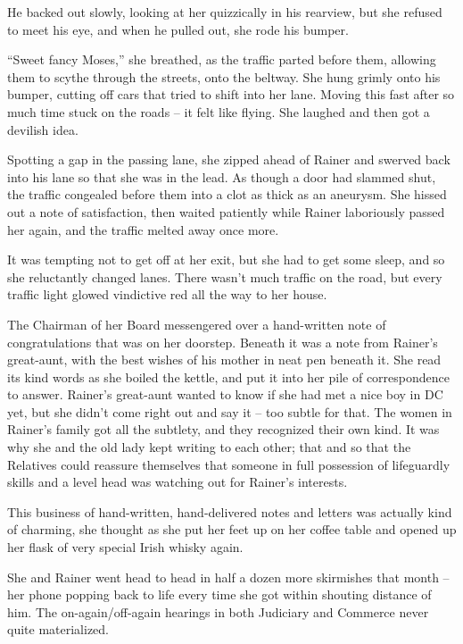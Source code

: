 He backed out slowly, looking at her quizzically in his rearview, but 
she refused to meet his eye, and when he pulled out, she rode his 
bumper.

“Sweet fancy Moses,” she breathed, as the traffic parted before 
them, allowing them to scythe through the streets, onto the beltway. 
She hung grimly onto his bumper, cutting off cars that tried to shift 
into her lane. Moving this fast after so much time stuck on the roads 
-- it felt like flying. She laughed and then got a devilish idea.

Spotting a gap in the passing lane, she zipped ahead of Rainer and 
swerved back into his lane so that she was in the lead. As though a 
door had slammed shut, the traffic congealed before them into a clot as 
thick as an aneurysm. She hissed out a note of satisfaction, then 
waited patiently while Rainer laboriously passed her again, and the 
traffic melted away once more.

It was tempting not to get off at her exit, but she had to get some 
sleep, and so she reluctantly changed lanes. There wasn't much traffic 
on the road, but every traffic light glowed vindictive red all the way 
to her house.

The Chairman of her Board messengered over a hand-written note of 
congratulations that was on her doorstep. Beneath it was a note from 
Rainer's great-aunt, with the best wishes of his mother in neat pen 
beneath it. She read its kind words as she boiled the kettle, and put 
it into her pile of correspondence to answer. Rainer's great-aunt 
wanted to know if she had met a nice boy in DC yet, but she didn't come 
right out and say it -- too subtle for that. The women in Rainer's 
family got all the subtlety, and they recognized their own kind. It was 
why she and the old lady kept writing to each other; that and so that 
the Relatives could reassure themselves that someone in full possession 
of lifeguardly skills and a level head was watching out for Rainer's 
interests.

This business of hand-written, hand-delivered notes and letters was 
actually kind of charming, she thought as she put her feet up on her 
coffee table and opened up her flask of very special Irish whisky again.

\tb

She and Rainer went head to head in half a dozen more skirmishes that 
month -- her phone popping back to life every time she got within 
shouting distance of him. The on-again/off-again hearings in both 
Judiciary and Commerce never quite materialized.

